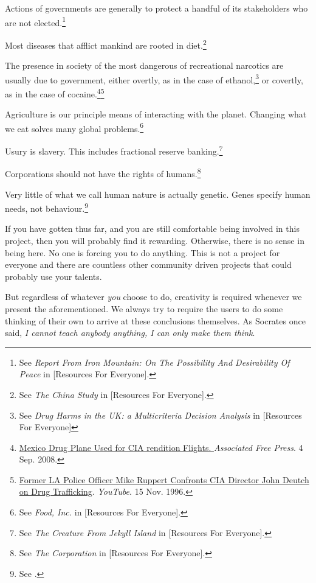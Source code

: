 \item
Actions of governments are generally to protect a handful of its stakeholders who are not elected.\footnote{See {\it Report From Iron Mountain: On The Possibility And Desirability Of Peace} in [Resources For Everyone].}

\item
Most diseases that afflict mankind are rooted in diet.\footnote{See {\it The China Study} in [Resources For Everyone].}

\item
The presence in society of the most dangerous of recreational narcotics are usually due to government, either overtly, as in the case of ethanol,\footnote{See {\it Drug Harms in the UK: a Multicriteria Decision Analysis} in [Resources For Everyone]} or covertly, as in the case of cocaine.\footnote{\href{http://afp.google.com/article/ALeqM5j6QonBKKMo2gw1e3ql-xUcQEZbVg}{Mexico Drug Plane Used for CIA rendition Flights. }{\it Associated Free Press}. 4 Sep. 2008.}\footnote{\href{http://www.youtube.com/watch?v=UT5MY3C86bk}{Former LA Police Officer Mike Ruppert Confronts CIA Director John Deutch on Drug Trafficking}. {\it YouTube}. 15 Nov. 1996.}

\item
Agriculture is our principle means of interacting with the planet. Changing what we eat solves many global problems.\footnote{See {\it Food, Inc.} in [Resources For Everyone].}

\item
Usury is slavery. This includes fractional reserve banking.\footnote{See {\it The Creature From Jekyll Island} in [Resources For Everyone].}

\item
Corporations should not have the rights of humans.\footnote{See {\it The Corporation} in [Resources For Everyone].}

\item
Very little of what we call human nature is actually genetic. Genes specify human needs, not behaviour.\footnote{See .}
\stopitemize

If you have gotten thus far, and you are still comfortable being involved in this project, then you will probably find it rewarding. Otherwise, there is no sense in being here. No one is forcing you to do anything. This is not a project for everyone and there are countless other community driven projects that could probably use your talents.

But regardless of whatever {\it you} choose to do, creativity is required whenever we present the aforementioned. We always try to require the users to do some thinking of their own to arrive at these conclusions themselves. As Socrates once said, {\it I cannot teach anybody anything, I can only make them think}.

\StopChapter

